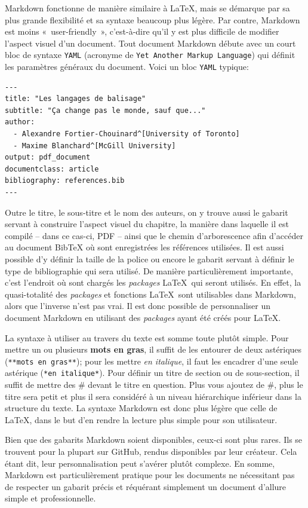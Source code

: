 \documentclass[
  letterpaper,
]{scrbook}
\begin{document}
Markdown fonctionne de manière similaire à \LaTeX, mais se démarque par
sa plus grande flexibilité et sa syntaxe beaucoup plus légère. Par
contre, Markdown est moins «~user-friendly~», c'est-à-dire qu'il y est
plus difficile de modifier l'aspect visuel d'un document. Tout document
Markdown débute avec un court bloc de syntaxe \texttt{YAML} (acronyme de
\texttt{Yet\ Another\ Markup\ Language}) qui définit les paramètres
généraux du document. Voici un bloc \texttt{YAML} typique:

\begin{verbatim}
---
title: "Les langages de balisage"
subtitle: "Ça change pas le monde, sauf que..."
author:
  - Alexandre Fortier-Chouinard^[University of Toronto]
  - Maxime Blanchard^[McGill University]
output: pdf_document
documentclass: article
bibliography: references.bib
---
\end{verbatim}

Outre le titre, le sous-titre et le nom des auteurs, on y trouve aussi
le gabarit servant à construire l'aspect visuel du chapitre, la manière
dans laquelle il est compilé -- dans ce cas-ci, PDF -- ainsi que le
chemin d'arborescence afin d'accéder au document BibTeX où sont
enregistrées les références utilisées. Il est aussi possible d'y définir
la taille de la police ou encore le gabarit servant à définir le type de
bibliographie qui sera utilisé. De manière particulièrement importante,
c'est l'endroit où sont chargés les \emph{packages} \LaTeX~qui seront
utilisés. En effet, la quasi-totalité des \emph{packages} et fonctions
\LaTeX~sont utilisables dans Markdown, alors que l'inverse n'est pas
vrai. Il est donc possible de personnaliser un document Markdown en
utilisant des \emph{packages} ayant été créés pour \LaTeX.

La syntaxe à utiliser au travers du texte est somme toute plutôt simple.
Pour mettre un ou plusieurs \textbf{mots en gras}, il suffit de les
entourer de deux astériques (\texttt{**mots\ en\ gras**}); pour les
mettre \emph{en italique}, il faut les encadrer d'une seule astérique
(\texttt{*en\ italique*}). Pour définir un titre de section ou de
sous-section, il suffit de mettre des \# devant le titre en question.
Plus vous ajoutez de \#, plus le titre sera petit et plus il sera
considéré à un niveau hiérarchique inférieur dans la structure du texte.
La syntaxe Markdown est donc plus légère que celle de \LaTeX, dans le
but d'en rendre la lecture plus simple pour son utilisateur.

Bien que des gabarits Markdown soient disponibles, ceux-ci sont plus
rares. Ils se trouvent pour la plupart sur GitHub, rendus disponibles
par leur créateur. Cela étant dit, leur personnalisation peut s'avérer
plutôt complexe. En somme, Markdown est particulièrement pratique pour
les documents ne nécessitant pas de respecter un gabarit précis et
réquérant simplement un document d'allure simple et professionnelle.
\end{document}
